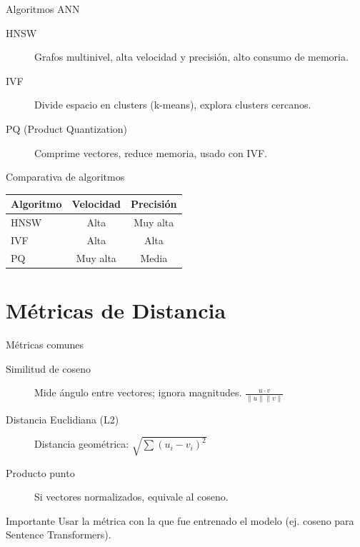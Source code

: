 \documentclass[aspectratio=169, 10pt, xcolor=table]{beamer}
\begin{document}
\begin{frame}{Algoritmos ANN}
    \begin{description}
        \item[HNSW] Grafos multinivel, alta velocidad y precisión, alto consumo de memoria.
        \item[IVF] Divide espacio en clusters (k-means), explora clusters cercanos.
        \item[PQ (Product Quantization)] Comprime vectores, reduce memoria, usado con IVF.
    \end{description}
\end{frame}

\begin{frame}{Comparativa de algoritmos}
    \begin{table}
        \centering
        \begin{tabular}{l|c|c}
            \toprule
            Algoritmo & Velocidad & Precisión \\
            \midrule
            HNSW & Alta & Muy alta \\
            IVF & Alta & Alta \\
            PQ & Muy alta & Media \\
            \bottomrule
        \end{tabular}
    \end{table}
\end{frame}

\section{Métricas de Distancia}

\begin{frame}{Métricas comunes}
    \begin{description}
        \item[Similitud de coseno] Mide ángulo entre vectores; ignora magnitudes. $\frac{u \cdot v}{\|u\|\|v\|}$
        \item[Distancia Euclidiana (L2)] Distancia geométrica: $\sqrt{\sum (u_i - v_i)^2}$
        \item[Producto punto] Si vectores normalizados, equivale al coseno.
    \end{description}
    \begin{alertblock}{Importante}
        Usar la métrica con la que fue entrenado el modelo (ej. coseno para Sentence Transformers).
    \end{alertblock}
\end{frame}
\end{document}
